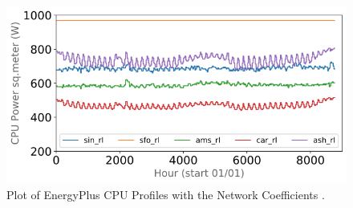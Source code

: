 \begin{figure}[h]
\centering
    \includegraphics[scale=0.4]{traffic_profile/images/site_profile.png}
    \caption[CPU-Site Profile]{Plot of EnergyPlus CPU Profiles with the Network Coefficients .}
\label{cpu_site}
\end{figure}
